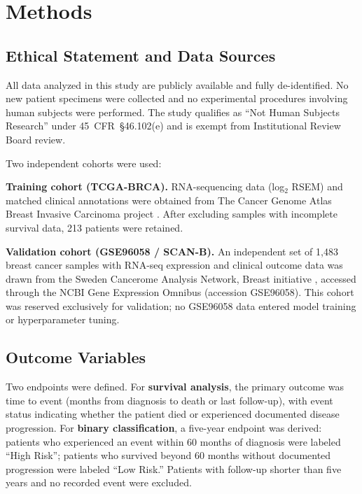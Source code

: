 \documentclass[11pt]{article}
\begin{document}
\section{Methods}
\label{sec:methods}

\subsection{Ethical Statement and Data Sources}

All data analyzed in this study are publicly available and fully de-identified. No new patient specimens were collected and no experimental procedures involving human subjects were performed. The study qualifies as ``Not Human Subjects Research'' under 45~CFR~\S46.102(e) and is exempt from Institutional Review Board review.

Two independent cohorts were used:

\textbf{Training cohort (TCGA-BRCA).} RNA-sequencing data (log$_2$ RSEM) and matched clinical annotations were obtained from The Cancer Genome Atlas Breast Invasive Carcinoma project \citep{tcga2012}. After excluding samples with incomplete survival data, 213 patients were retained.

\textbf{Validation cohort (GSE96058 / SCAN-B).} An independent set of 1,483 breast cancer samples with RNA-seq expression and clinical outcome data was drawn from the Sweden Cancerome Analysis Network, Breast initiative \citep{saal2015,brueffer2018}, accessed through the NCBI Gene Expression Omnibus (accession GSE96058). This cohort was reserved exclusively for validation; no GSE96058 data entered model training or hyperparameter tuning.

\subsection{Outcome Variables}

Two endpoints were defined. For \textbf{survival analysis}, the primary outcome was time to event (months from diagnosis to death or last follow-up), with event status indicating whether the patient died or experienced documented disease progression. For \textbf{binary classification}, a five-year endpoint was derived: patients who experienced an event within 60 months of diagnosis were labeled ``High Risk''; patients who survived beyond 60 months without documented progression were labeled ``Low Risk.'' Patients with follow-up shorter than five years and no recorded event were excluded.
\end{document}
